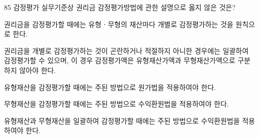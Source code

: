 \begin{question}{85}
감정평가 실무기준상 권리금 감정평가방법에 관한 설명으로 옳지 않은 것은?
\begin{choices}
  \item 권리금을 감정평가할 때에는 유형ㆍ무형의 재산마다 개별로 감정평가하는 것을 원칙으로 한다.
  \item 권리금을 개별로 감정평가하는 것이 곤란하거나 적절하지 아니한 경우에는 일괄하여 감정평가할 수 있으며, 이 경우 감정평가액은 유형재산가액과 무형재산가액으로 구분하지 않아야 한다.
  \item 유형재산을 감정평가할 때에는 주된 방법으로 원가법을 적용하여야 한다.
  \item 무형재산을 감정평가할 때에는 주된 방법으로 수익환원법을 적용하여야 한다.
  \item 유형재산과 무형재산을 일괄하여 감정평가할 때에는 주된 방법으로 수익환원법을 적용하여야 한다.
\end{choices}
\end{question}
